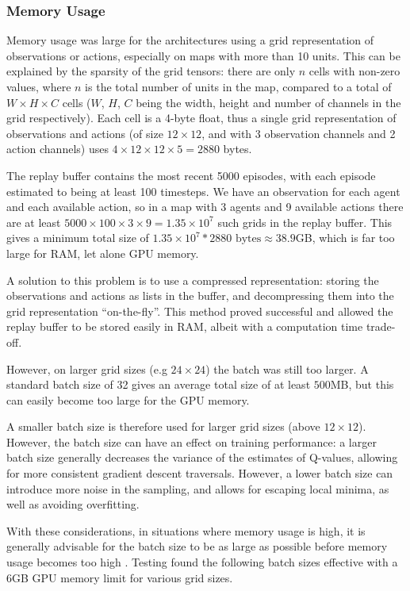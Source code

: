 \subsubsection{Memory Usage}

Memory usage was large for the architectures using a grid representation of observations or actions, especially on maps with more than 10 units. This can be explained by the sparsity of the grid tensors: there are only $n$ cells with non-zero values, where $n$ is the total number of units in the map, compared to a total of $W \times H \times C$ cells ($W$, $H$, $C$ being the width, height and number of channels in the grid respectively). Each cell is a 4-byte float, thus a single grid representation of observations and actions (of size $12 \times 12$, and with 3 observation channels and 2 action channels) uses $4 \times 12 \times 12 \times 5 = 2880$ bytes. 

The replay buffer contains the most recent 5000 episodes, with each episode estimated to being at least 100 timesteps. We have an observation for each agent and each available action, so in a map with 3 agents and 9 available actions there are at least $5000 \times 100 \times 3 \times 9 = 1.35 \times 10^7$ such grids in the replay buffer. This gives a minimum total size of $1.35 \times 10^7 * 2880 \text{ bytes} \approx 38.9$GB, which is far too large for RAM, let alone GPU memory.


A solution to this problem is to use a compressed representation: storing the observations and actions as lists in the buffer, and decompressing them into the grid representation ``on-the-fly''. This method proved successful and allowed the replay buffer to be stored easily in RAM, albeit with a computation time trade-off.

However, on larger grid sizes (e.g $24\times24$) the batch was still too larger. A standard batch size of 32 \cite{smac} gives an average total size of at least $500$MB, but this can easily become too large for the GPU memory. 

A smaller batch size is therefore used for larger grid sizes (above $12 \times 12$). However, the batch size can have an effect on training performance: a larger batch size generally decreases the variance of the estimates of Q-values, allowing for more consistent gradient descent traversals. However, a lower batch size can introduce more noise in the sampling, and allows for escaping local minima, as well as avoiding overfitting.

With these considerations, in situations where memory usage is high, it is generally advisable for the batch size to be as large as possible before memory usage becomes too high \cite{batchsizes}. Testing found the following batch sizes effective with a 6GB GPU memory limit for various grid sizes.

